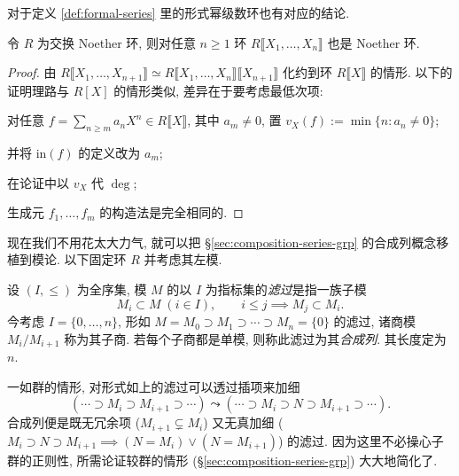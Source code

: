对于定义 \ref{def:formal-series} 里的形式幂级数环也有对应的结论.
\begin{theorem}
	令 $R$ 为交换 Noether 环, 则对任意 $n \geq 1$ 环 $R\llbracket X_1, \ldots, X_n \rrbracket$ 也是 Noether 环.
\end{theorem}
\begin{proof}
	由 $R \llbracket X_1, \ldots, X_{n+1}\rrbracket \simeq R \llbracket X_1, \ldots, X_n \rrbracket \llbracket X_{n+1}\rrbracket$ 化约到环 $R \llbracket X \rrbracket$ 的情形. 以下的证明理路与 $R[X]$ 的情形类似, 差异在于要考虑最低次项:
	\begin{compactitem}
		\item 对任意 $f = \sum_{n \geq m} a_n X^n \in R\llbracket X \rrbracket$, 其中 $a_m \neq 0$, 置 $v_X(f) := \min\{n: a_n \neq 0\}$;
		\item 并将 $\text{in}(f)$ 的定义改为 $a_m$;
		\item 在论证中以 $v_X$ 代 $\deg$;
	\end{compactitem}
	生成元 $f_1, \ldots, f_m$ 的构造法是完全相同的.
\end{proof}

现在我们不用花太大力气, 就可以把 \S\ref{sec:composition-series-grp} 的合成列概念移植到模论. 以下固定环 $R$ 并考虑其左模.
\begin{definition}
	设 $(I, \leq)$ 为全序集, 模 $M$ 的以 $I$ 为指标集的\emph{滤过}是指一族子模
	\[ M_i \subset M\; (i \in I), \qquad i \leq j \implies M_j \subset M_i. \]
	今考虑 $I = \{0, \ldots, n\}$, 形如 $M = M_0 \supset M_1 \supset \cdots \supset M_n = \{0\}$ 的滤过, 诸商模 $M_i/M_{i+1}$ 称为其子商. 若每个子商都是单模, 则称此滤过为其\emph{合成列}. 其长度定为 $n$.
\end{definition}
一如群的情形, 对形式如上的滤过可以透过插项来加细
\[ (\cdots \supset M_i \supset M_{i+1} \supset \cdots) \leadsto (\cdots \supset M_i \supset N \supset M_{i+1} \supset \cdots). \]
合成列便是既无冗余项 ($M_{i+1} \subsetneq M_i$) 又无真加细 ($M_i \supset N \supset M_{i+1} \implies (N=M_i) \vee (N=M_{i+1})$) 的滤过. 因为这里不必操心子群的正则性, 所需论证较群的情形 (\S\ref{sec:composition-series-grp}) 大大地简化了.

